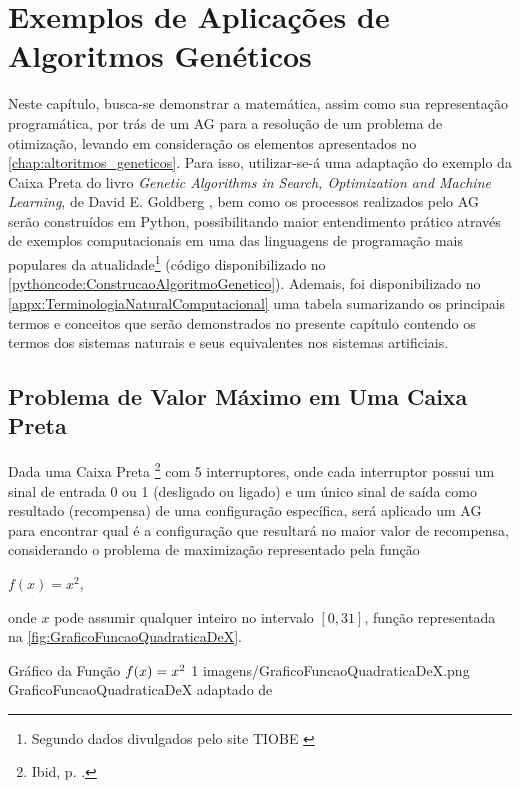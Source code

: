 \chapter{Exemplos de Aplicações de Algoritmos Genéticos}

Neste capítulo, busca-se demonstrar a matemática, assim como sua representação programática, por trás de um AG para a resolução de um problema de otimização, levando em consideração os elementos apresentados no \autoref{chap:altoritmos_geneticos}. Para isso, utilizar-se-á uma adaptação do exemplo da Caixa Preta do livro \textit{Genetic Algorithms in Search, Optimization and Machine Learning}, de David E. Goldberg \citeyearpar{goldberg_genetic_1989}, bem como os processos realizados pelo AG serão construídos em Python, possibilitando maior entendimento prático através de exemplos computacionais em uma das linguagens de programação mais populares da atualidade\footnote{Segundo dados divulgados pelo site TIOBE \citet{noauthor_index_nodate}} (código disponibilizado no \autoref{pythoncode:ConstrucaoAlgoritmoGenetico}). Ademais, foi disponibilizado no \autoref{appx:TerminologiaNaturalComputacional} uma tabela sumarizando os principais termos e conceitos que serão demonstrados no presente capítulo contendo os termos dos sistemas naturais e seus equivalentes nos sistemas artificiais.

\section{Problema de Valor Máximo em Uma Caixa Preta}
\label{sec:ProblemaValorMaximoCaixaPreta}

Dada uma Caixa Preta \footnote{Ibid, p. \pageref{rodape:problema_caixa_preta}.} com 5 interruptores, onde cada interruptor possui um sinal de entrada 0 ou 1 (desligado ou ligado) e um único sinal de saída como resultado (recompensa) de uma configuração específica, será aplicado um AG para encontrar qual é a configuração que resultará no maior valor de recompensa, considerando o problema de maximização representado pela função

\begin{center}
	$f(x) = x^2$,
\end{center}

\noindent onde $x$ pode assumir qualquer inteiro no intervalo $\left[0, 31\right]$, função representada na \autoref{fig:GraficoFuncaoQuadraticaDeX}.

\figura
	{Gráfico da Função $\lowercase{f}(\lowercase{x}) = \lowercase{x}^2$}
	{1}
	{imagens/GraficoFuncaoQuadraticaDeX.png}
	{GraficoFuncaoQuadraticaDeX}
	{adaptado de \citet[pg.8]{goldberg_genetic_1989}}
	
